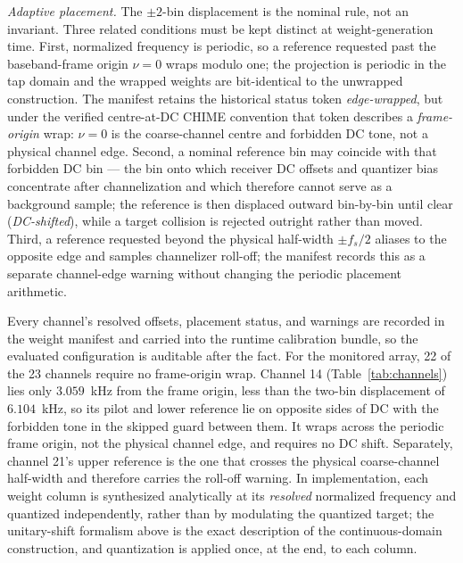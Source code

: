 \textit{Adaptive placement.} The $\pm 2$-bin displacement is the nominal rule, not an invariant. Three related conditions must be kept distinct at weight-generation time. First, normalized frequency is periodic, so a reference requested past the baseband-frame origin $\nu=0$ wraps modulo one; the projection is periodic in the tap domain and the wrapped weights are bit-identical to the unwrapped construction. The manifest retains the historical status token \emph{edge-wrapped}, but under the verified centre-at-DC CHIME convention that token describes a \emph{frame-origin} wrap: $\nu=0$ is the coarse-channel centre and forbidden DC tone, not a physical channel edge. Second, a nominal reference bin may coincide with that forbidden DC bin --- the bin onto which receiver DC offsets and quantizer bias concentrate after channelization and which therefore cannot serve as a background sample; the reference is then displaced outward bin-by-bin until clear (\emph{DC-shifted}), while a target collision is rejected outright rather than moved. Third, a reference requested beyond the physical half-width $\pm f_s/2$ aliases to the opposite edge and samples channelizer roll-off; the manifest records this as a separate channel-edge warning without changing the periodic placement arithmetic.

Every channel's resolved offsets, placement status, and warnings are recorded in the weight manifest and carried into the runtime calibration bundle, so the evaluated configuration is auditable after the fact. For the monitored array, 22 of the 23 channels require no frame-origin wrap. Channel 14 (Table~\ref{tab:channels}) lies only $3.059$~kHz from the frame origin, less than the two-bin displacement of $6.104$~kHz, so its pilot and lower reference lie on opposite sides of DC with the forbidden tone in the skipped guard between them. It wraps across the periodic frame origin, not the physical channel edge, and requires no DC shift. Separately, channel 21's upper reference is the one that crosses the physical coarse-channel half-width and therefore carries the roll-off warning. In implementation, each weight column is synthesized analytically at its \emph{resolved} normalized frequency and quantized independently, rather than by modulating the quantized target; the unitary-shift formalism above is the exact description of the continuous-domain construction, and quantization is applied once, at the end, to each column.

